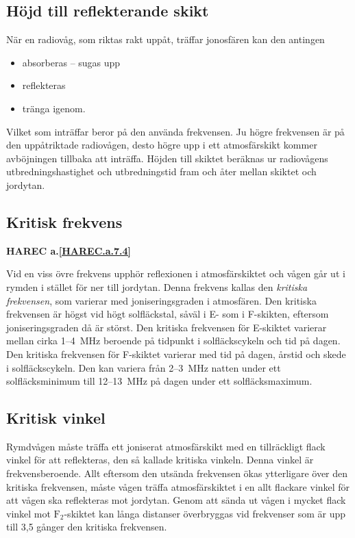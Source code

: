 \subsection{Höjd till reflekterande skikt}

När en radiovåg, som riktas rakt uppåt, träffar jonosfären kan den antingen
\begin{itemize}
  \item absorberas -- sugas upp
  \item reflekteras
  \item tränga igenom.
\end{itemize}

Vilket som inträffar beror på den använda frekvensen.
Ju högre frekvensen är på den uppåtriktade radiovågen, desto högre upp i ett
atmosfärskikt kommer avböjningen tillbaka att inträffa.
Höjden till skiktet beräknas ur radiovågens utbredningshastighet och
utbredningstid fram och åter mellan skiktet och jordytan.

\subsection{Kritisk frekvens}
\textbf{
HAREC a.\ref{HAREC.a.7.4}\label{myHAREC.a.7.4}
}

Vid en viss övre frekvens upphör reflexionen i atmosfärskiktet och
vågen går ut i rymden i stället för ner till jordytan.
Denna frekvens kallas den \emph{kritiska frekvensen}, som varierar med
joniseringsgraden i atmosfären.
Den kritiska frekvensen är högst vid högt solfläckstal, såväl i E- som i
F-skikten, eftersom joniseringsgraden då är störst.
Den kritiska frekvensen för E-skiktet varierar mellan cirka 1--4~MHz beroende på
tidpunkt i solfläckscykeln och tid på dagen.
Den kritiska frekvensen för F-skiktet varierar med tid på dagen, årstid och
skede i solfläckscykeln.
Den kan variera från 2--3~MHz natten under ett solfläcksminimum till 12--13~MHz
på dagen under ett solfläcksmaximum.

\subsection{Kritisk vinkel}

Rymdvågen måste träffa ett joniserat atmosfärskikt med en tillräckligt
flack vinkel för att reflekteras, den så kallade kritiska vinkeln.
Denna vinkel är frekvensberoende.
Allt eftersom den utsända frekvensen ökas ytterligare över den kritiska
frekvensen, måste vågen träffa atmosfärskiktet i en allt flackare vinkel för att
vågen ska reflekteras mot jordytan.
Genom att sända ut vågen i mycket flack vinkel mot \(\mathrm{F_2}\)-skiktet kan
långa distanser överbryggas vid frekvenser som är upp till 3,5 gånger den
kritiska frekvensen.

